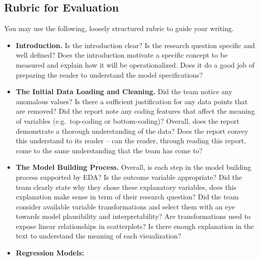 \documentclass[
]{article}
\begin{document}
\hypertarget{rubric-for-evaluation}{%
\subsection{Rubric for Evaluation}\label{rubric-for-evaluation}}

You may use the following, loosely structured rubric to guide your
writing.

\begin{itemize}
\item
  \textbf{Introduction.} Is the introduction clear? Is the research
  question specific and well defined? Does the introduction motivate a
  specific concept to be measured and explain how it will be
  operationalized. Does it do a good job of preparing the reader to
  understand the model specifications?
\item
  \textbf{The Initial Data Loading and Cleaning.} Did the team notice
  any anomalous values? Is there a sufficient justification for any data
  points that are removed? Did the report note any coding features that
  affect the meaning of variables (e.g.~top-coding or bottom-coding)?
  Overall, does the report demonstrate a thorough understanding of the
  data? Does the report convey this understand to its reader -- can the
  reader, through reading this report, come to the same understanding
  that the team has come to?
\item
  \textbf{The Model Building Process.} Overall, is each step in the
  model building process supported by EDA? Is the outcome variable
  appropriate? Did the team clearly state why they chose these
  explanatory variables, does this explanation make sense in term of
  their research question? Did the team consider available variable
  transformations and select them with an eye towards model plausibility
  and interpretability? Are transformations used to expose linear
  relationships in scatterplots? Is there enough explanation in the text
  to understand the meaning of each visualization?
\item
  \textbf{Regression Models:}


\end{itemize}
\end{document}
